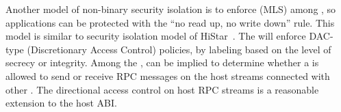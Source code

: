 Another model of non-binary security isolation
is to enforce  (MLS) among \picoprocs{},
so applications can be protected
with the ``no read up, no write down'' rule.
This model is similar to security isolation model of HiStar~\citep{zeldovich+histar}.
The \liboses{} will enforce DAC-type (Discretionary Access Control) policies,
by labeling \picoprocs{} based on the level of secrecy or integrity.
Among the \picoprocs{},  can be implied to
determine whether a \picoproc{} is allowed to send or receive RPC messages
on the host streams connected with other \picoprocs{}.
The directional access control on host RPC streams is
a reasonable extension to the host ABI.











%

